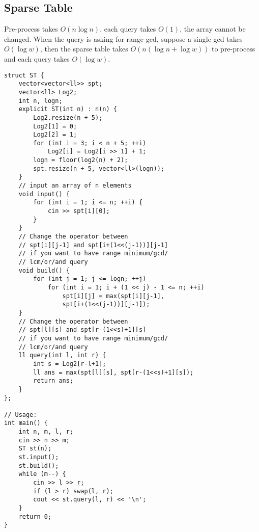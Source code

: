 \documentclass[10pt]{article}{\twocolumn}
\begin{document}
\subsection{Sparse Table}
Pre-process takes $O(n\log{n})$, each query takes $O(1)$, the array cannot be changed.
When the query is asking for range gcd, suppose a single gcd takes $O(\log{w})$, then the sparse table takes $O(n(\log{n}+\log{w}))$ to pre-process and each query takes $O(\log{w})$.
\begin{lstlisting}
struct ST {
    vector<vector<ll>> spt;
    vector<ll> Log2;
    int n, logn;
    explicit ST(int n) : n(n) {
        Log2.resize(n + 5);
        Log2[1] = 0;
        Log2[2] = 1;
        for (int i = 3; i < n + 5; ++i)
            Log2[i] = Log2[i >> 1] + 1;
        logn = floor(log2(n) + 2);
        spt.resize(n + 5, vector<ll>(logn));
    }
    // input an array of n elements
    void input() {
        for (int i = 1; i <= n; ++i) {
            cin >> spt[i][0];
        }
    }
    // Change the operator between 
    // spt[i][j-1] and spt[i+(1<<(j-1))][j-1]
    // if you want to have range minimum/gcd/
    // lcm/or/and query
    void build() {
        for (int j = 1; j <= logn; ++j)
            for (int i = 1; i + (1 << j) - 1 <= n; ++i)
                spt[i][j] = max(spt[i][j-1],
                spt[i+(1<<(j-1))][j-1]);
    }
    // Change the operator between 
    // spt[l][s] and spt[r-(1<<s)+1][s]
    // if you want to have range minimum/gcd/
    // lcm/or/and query
    ll query(int l, int r) {
        int s = Log2[r-l+1];
        ll ans = max(spt[l][s], spt[r-(1<<s)+1][s]);
        return ans;
    }
};

// Usage:
int main() {
    int n, m, l, r;
    cin >> n >> m;
    ST st(n);
    st.input();
    st.build();
    while (m--) {
        cin >> l >> r;
        if (l > r) swap(l, r);
        cout << st.query(l, r) << '\n';
    }
    return 0;
}
\end{lstlisting}
\end{document}
